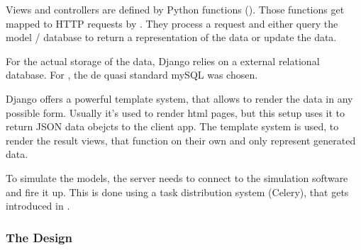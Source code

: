 Views and controllers are defined by Python functions ().
Those functions get mapped to HTTP requests by .
They process a request and either query the model / database to return a representation of the data or update the data.

For the actual storage of the data, Django relies on a external relational database.
For \spl, the de quasi standard mySQL was chosen.

Django offers a powerful template system, that allows to render the data in any possible form.
Usually it's used to render html pages, but this setup uses it to return JSON data obejcts to the client app.
The template system is used, to render the result views, that function on their own and only represent generated data.

To simulate the models, the server needs to connect to the simulation software and fire it up.
This is done using a task distribution system (Celery), that gets introduced in .







\subsubsection{The Design}








